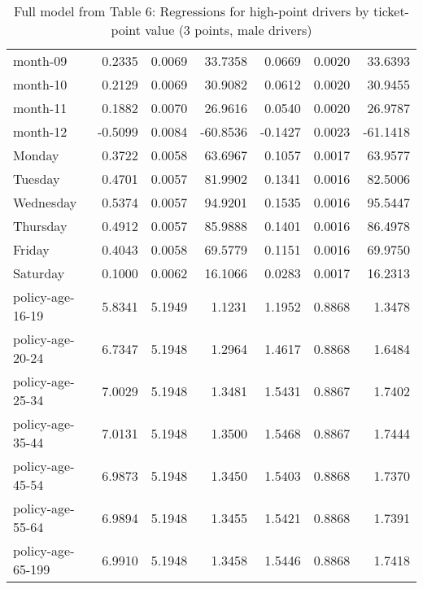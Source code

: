 \documentclass[10pt]{article}
\begin{document}
\begin{table}[ht]
\begin{tabular}{lrrrrrr}
  month-09 & 0.2335 & 0.0069 & 33.7358 & 0.0669 & 0.0020 & 33.6393 \\ 
  month-10 & 0.2129 & 0.0069 & 30.9082 & 0.0612 & 0.0020 & 30.9455 \\ 
  month-11 & 0.1882 & 0.0070 & 26.9616 & 0.0540 & 0.0020 & 26.9787 \\ 
  month-12 & -0.5099 & 0.0084 & -60.8536 & -0.1427 & 0.0023 & -61.1418 \\ 
  Monday & 0.3722 & 0.0058 & 63.6967 & 0.1057 & 0.0017 & 63.9577 \\ 
  Tuesday & 0.4701 & 0.0057 & 81.9902 & 0.1341 & 0.0016 & 82.5006 \\ 
  Wednesday & 0.5374 & 0.0057 & 94.9201 & 0.1535 & 0.0016 & 95.5447 \\ 
  Thursday & 0.4912 & 0.0057 & 85.9888 & 0.1401 & 0.0016 & 86.4978 \\ 
  Friday & 0.4043 & 0.0058 & 69.5779 & 0.1151 & 0.0016 & 69.9750 \\ 
  Saturday & 0.1000 & 0.0062 & 16.1066 & 0.0283 & 0.0017 & 16.2313 \\ 
  policy-age-16-19 & 5.8341 & 5.1949 & 1.1231 & 1.1952 & 0.8868 & 1.3478 \\ 
  policy-age-20-24 & 6.7347 & 5.1948 & 1.2964 & 1.4617 & 0.8868 & 1.6484 \\ 
  policy-age-25-34 & 7.0029 & 5.1948 & 1.3481 & 1.5431 & 0.8867 & 1.7402 \\ 
  policy-age-35-44 & 7.0131 & 5.1948 & 1.3500 & 1.5468 & 0.8867 & 1.7444 \\ 
  policy-age-45-54 & 6.9873 & 5.1948 & 1.3450 & 1.5403 & 0.8868 & 1.7370 \\ 
  policy-age-55-64 & 6.9894 & 5.1948 & 1.3455 & 1.5421 & 0.8868 & 1.7391 \\ 
  policy-age-65-199 & 6.9910 & 5.1948 & 1.3458 & 1.5446 & 0.8868 & 1.7418 \\ 
   \hline
\end{tabular}
\caption{Full model from Table 6: Regressions for high-point drivers by ticket-point value (3 points, male drivers)} 
\label{tab_6_3_pts_M}
\end{table}


\clearpage
\pagebreak



\end{document}
